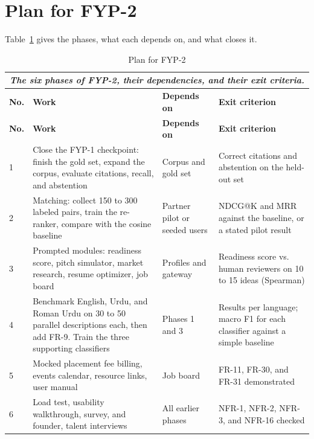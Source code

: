 \documentclass{FastFyp}
\newcommand{\capdesclt}[2]{%
  \multicolumn{#1}{c}{%
    \begingroup\setstretch{1}%
    \parbox[t]{0.92\textwidth}{%
      \centering\normalfont\mdseries\itshape\small #2%
      \vspace{0.15\baselineskip}}%
    \endgroup}\\
}
\begin{document}
\section{Plan for FYP-2}
Table~\ref{tab:fyp2-plan} gives the phases, what each depends on, and what closes it.

\begin{longtable}{|p{}|p{}|p{}|p{}|}
\caption{Plan for FYP-2}
\label{tab:fyp2-plan}\\[-10pt]
\capdesclt{4}{The six phases of FYP-2, their dependencies, and their exit criteria.}
\hline
\textbf{No.} & \textbf{Work} & \textbf{Depends on} & \textbf{Exit criterion} \\ \hline
\endfirsthead
\hline
\textbf{No.} & \textbf{Work} & \textbf{Depends on} & \textbf{Exit criterion} \\ \hline
\endhead

1 & Close the FYP-1 checkpoint: finish the gold set, expand the corpus, evaluate citations, recall, and abstention & Corpus and gold set & Correct citations and abstention on the held-out set \\ \hline

2 & Matching: collect 150 to 300 labeled pairs, train the re-ranker, compare with the cosine baseline & Partner pilot or seeded users & NDCG@K and MRR against the baseline, or a stated pilot result \\ \hline

3 & Prompted modules: readiness score, pitch simulator, market research, resume optimizer, job board & Profiles and gateway & Readiness score vs. human reviewers on 10 to 15 ideas (Spearman) \\ \hline

4 & Benchmark English, Urdu, and Roman Urdu on 30 to 50 parallel descriptions each, then add FR-9. Train the three supporting classifiers & Phases 1 and 3 & Results per language; macro F1 for each classifier against a simple baseline \\ \hline

5 & Mocked placement fee billing, events calendar, resource links, user manual & Job board & FR-11, FR-30, and FR-31 demonstrated \\ \hline

6 & Load test, usability walkthrough, survey, and founder, talent interviews & All earlier phases & NFR-1, NFR-2, NFR-3, and NFR-16 checked \\ \hline

\end{longtable}
\end{document}
